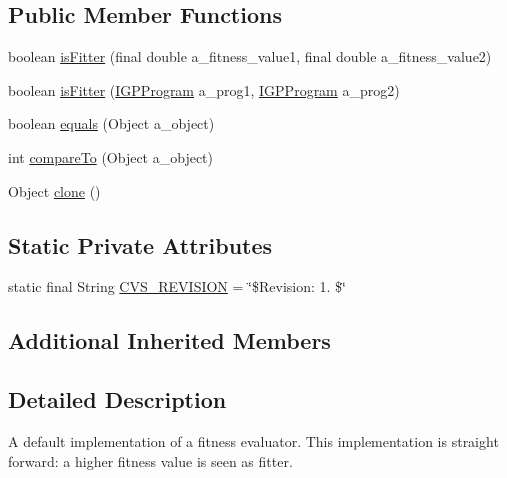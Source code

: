 \subsection*{Public Member Functions}
\begin{DoxyCompactItemize}
\item 
boolean \hyperlink{classorg_1_1jgap_1_1gp_1_1impl_1_1_default_g_p_fitness_evaluator_a5dd2f9242f293300f2689c9e86a32aee}{is\-Fitter} (final double a\-\_\-fitness\-\_\-value1, final double a\-\_\-fitness\-\_\-value2)
\item 
boolean \hyperlink{classorg_1_1jgap_1_1gp_1_1impl_1_1_default_g_p_fitness_evaluator_af38c72c70f7a22ff7902e58fc201a074}{is\-Fitter} (\hyperlink{interfaceorg_1_1jgap_1_1gp_1_1_i_g_p_program}{I\-G\-P\-Program} a\-\_\-prog1, \hyperlink{interfaceorg_1_1jgap_1_1gp_1_1_i_g_p_program}{I\-G\-P\-Program} a\-\_\-prog2)
\item 
boolean \hyperlink{classorg_1_1jgap_1_1gp_1_1impl_1_1_default_g_p_fitness_evaluator_ade2a922518659d0a664cccc5e3e9fddf}{equals} (Object a\-\_\-object)
\item 
int \hyperlink{classorg_1_1jgap_1_1gp_1_1impl_1_1_default_g_p_fitness_evaluator_a145b4b199ef26a11b1fe811f1fc3e748}{compare\-To} (Object a\-\_\-object)
\item 
Object \hyperlink{classorg_1_1jgap_1_1gp_1_1impl_1_1_default_g_p_fitness_evaluator_a4b4be78c93fe8690e02658d492e273d8}{clone} ()
\end{DoxyCompactItemize}
\subsection*{Static Private Attributes}
\begin{DoxyCompactItemize}
\item 
static final String \hyperlink{classorg_1_1jgap_1_1gp_1_1impl_1_1_default_g_p_fitness_evaluator_abe516b191462d06da06c613050333e08}{C\-V\-S\-\_\-\-R\-E\-V\-I\-S\-I\-O\-N} = \char`\"{}\$Revision\-: 1. \$\char`\"{}
\end{DoxyCompactItemize}
\subsection*{Additional Inherited Members}


\subsection{Detailed Description}
A default implementation of a fitness evaluator. This implementation is straight forward\-: a higher fitness value is seen as fitter.

